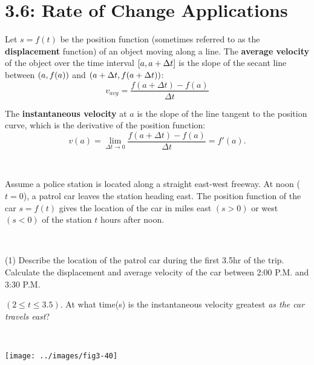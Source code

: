 \documentclass[../mathNotesPreamble]{subfiles}
\begin{document}
\section{3.6: Rate of Change Applications}
\begin{defn*}
  Let $s=f(t)$ be the position function (sometimes referred to as the \textbf{displacement} function) of an object moving along a line. The \textbf{average velocity} of the object over the time interval ${\left[a,a+\Delta t\right]}$ is the slope of the secant line between ${\left(a,f(a)\right)}$ and ${\left(a+\Delta t,f(a+\Delta t)\right)}$:
    $$v_{avg}=\frac{f(a+\Delta t)-f(a)}{\Delta t}$$
  
  The \textbf{instantaneous velocity} at $a$ is the slope of the line tangent to the position curve, which is the derivative of the position function:
    $$v(a)=\lim_{\Delta t \to 0} \frac{f(a+\Delta t)-f(a)}{\Delta t}=f'(a).$$
\end{defn*}

\begin{ex*}\ 

\noindent
Assume a police station is located along a straight east-west freeway. At noon ($t=0$), a patrol car leaves the station heading east. The position function of the car $s=f(t)$ gives the location of the car in miles east $(s>0)$ or west $(s<0)$ of the station $t$ hours after noon.
\end{ex*}
\vspace*{-20pt}
\begin{minipage}[t]{0.6\linewidth}\ 

  \begin{tasks}(1)
    \task Describe the location of the patrol car during the first 3.5hr of the trip.
    \task Calculate the displacement and average velocity of the car between 2:00 P.M. and 3:30 P.M. 
    
    $(2\leq t\leq3.5)$.
    \task At what time(s) is the instantaneous velocity greatest \textit{as the car travels east}?
  \end{tasks}
\end{minipage}%
\begin{minipage}[t]{0.4\linewidth}\ 

  \begin{flushright}
    \texttt{[image: ../images/fig3-40]}
  \end{flushright}
\end{minipage}
\end{document}
